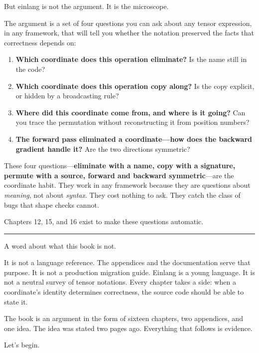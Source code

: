 \documentclass[11pt,]{article}
\providecommand{\tightlist}{%
  \setlength{\itemsep}{0pt}\setlength{\parskip}{0pt}}
\begin{document}
But einlang is not the argument. It is the microscope.

The argument is a set of four questions you can ask about any tensor
expression, in any framework, that will tell you whether the notation
preserved the facts that correctness depends on:

\begin{enumerate}
\def\labelenumi{\arabic{enumi}.}
\tightlist
\item
  \textbf{Which coordinate does this operation eliminate?} Is the name
  still in the code?
\item
  \textbf{Which coordinate does this operation copy along?} Is the copy
  explicit, or hidden by a broadcasting rule?
\item
  \textbf{Where did this coordinate come from, and where is it going?}
  Can you trace the permutation without reconstructing it from position
  numbers?
\item
  \textbf{The forward pass eliminated a coordinate---how does the
  backward gradient handle it?} Are the two directions symmetric?
\end{enumerate}

These four questions---\textbf{eliminate with a name, copy with a
signature, permute with a source, forward and backward symmetric}---are
the coordinate habit. They work in any framework because they are
questions about \emph{meaning}, not about \emph{syntax}. They cost
nothing to ask. They catch the class of bugs that shape checks cannot.

Chapters 12, 15, and 16 exist to make these questions automatic.

\begin{center}\rule{0.5\linewidth}{0.4pt}\end{center}

A word about what this book is not.

It is not a language reference. The appendices and the documentation
serve that purpose. It is not a production migration guide. Einlang is a
young language. It is not a neutral survey of tensor notations. Every
chapter takes a side: when a coordinate's identity determines
correctness, the source code should be able to state it.

The book is an argument in the form of sixteen chapters, two appendices,
and one idea. The idea was stated two pages ago. Everything that follows
is evidence.

Let's begin.

\newpage
\end{document}
